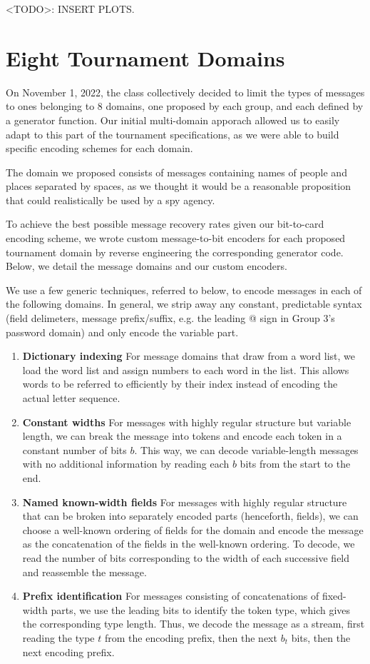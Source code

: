 \documentclass{article}
\begin{document}
<TODO>: INSERT PLOTS.

\section{Eight Tournament Domains}

On November 1, 2022, the class collectively decided to limit the types of messages to ones belonging to 8 domains, one proposed by each group, and each defined by a generator function. Our initial multi-domain apporach allowed us to easily adapt to this part of the tournament specifications, as we were able to build specific encoding schemes for each domain.

The domain we proposed consists of messages containing names of people and places separated by spaces, as we thought it would be a reasonable proposition that could realistically be used by a spy agency.

To achieve the best possible message recovery rates given our bit-to-card encoding scheme, we wrote custom message-to-bit encoders for each proposed tournament domain by reverse engineering the corresponding generator code. Below, we detail the message domains and our custom encoders.

We use a few generic techniques, referred to below, to encode messages in each of the following domains. In general, we strip away any constant, predictable syntax (field delimeters, message prefix/suffix, e.g. the leading @ sign in Group 3's password domain) and only encode the variable part.
\begin{enumerate}
    \item\textbf{Dictionary indexing} For message domains that draw from a word list, we load the word list and assign numbers to each word in the list. This allows words to be referred to efficiently by their index instead of encoding the actual letter sequence.
    \item\textbf{Constant widths} For messages with highly regular structure but variable length, we can break the message into tokens and encode each token in a constant number of bits $b$. This way, we can decode variable-length messages with no additional information by reading each $b$ bits from the start to the end.
    \item\textbf{Named known-width fields} For messages with highly regular structure that can be broken into separately encoded parts (henceforth, fields), we can choose a well-known ordering of fields for the domain and encode the message as the concatenation of the fields in the well-known ordering. To decode, we read the number of bits corresponding to the width of each successive field and reassemble the message.
    \item\textbf{Prefix identification} For messages consisting of concatenations of fixed-width parts, we use the leading bits to identify the token type, which gives the corresponding type length. Thus, we decode the message as a stream, first reading the type $t$ from the encoding prefix, then the next $b_t$ bits, then the next encoding prefix.
\end{enumerate}
\end{document}
